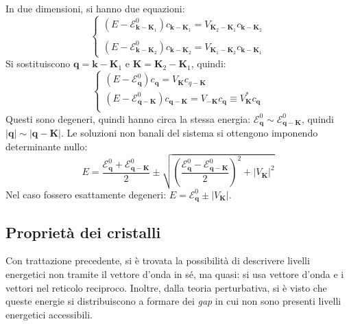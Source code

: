 \documentclass[10pt, a4paper]{scrartcl}
\numberwithin{equation}{subsection}
\theoremstyle{style1}
\begin{document}
In due dimensioni, si hanno due equazioni:
\[
\begin{cases}
	\displaystyle (E-\mathscr{E}^0_{\mathbf{k} - \mathbf{K} _1} )c_{\mathbf{k} -\mathbf{K} _1} = V_{\mathbf{K}_2 - \mathbf{K} _1} c_{\mathbf{k}-\mathbf{K}_2  } \\
	\\
	\displaystyle (E-\mathscr{E}^0_{\mathbf{k} - \mathbf{K} _2} )c_{\mathbf{k} -\mathbf{K} _2} = V_{\mathbf{K}_1 - \mathbf{K} _2} c_{\mathbf{k}-\mathbf{K}_1  } 
\end{cases}
\] 
Si sostituiscono $\mathbf{q} = \mathbf{k} -\mathbf{K} _1$ e $\mathbf{K} = \mathbf{K}_2 -\mathbf{K} _1$, quindi:
\begin{equation}
	\begin{cases}
		(E-\mathscr{E}^0_\mathbf{q} ) c_\mathbf{q}  = V_\mathbf{K} c_{q - \mathbf{K} } \\
		(E-\mathscr{E}^0_\mathbf{q-\mathbf{K} } ) c_\mathbf{q-\mathbf{K} }  = V_\mathbf{-K} c_{\mathbf{q} }\equiv V^*_\mathbf{K} c_\mathbf{q}  \\
	\end{cases}
\end{equation}
Questi sono degeneri, quindi hanno circa la stessa energia: $\mathscr{E}^0_{\mathbf{q} } \sim \mathscr{E}^0_{\mathbf{q} -\mathbf{K} } $, quindi $\lvert \mathbf{q}  \rvert \sim \lvert \mathbf{q} -\mathbf{K}  \rvert $. Le soluzioni non banali del sistema si ottengono imponendo determinante nullo:
\begin{equation}
	E = \frac{\mathscr{E}^0 _\mathbf{q}  + \mathscr{E}^0_{\mathbf{q- \mathbf{K} } } }{2} \pm \sqrt{\left(\frac{\mathscr{E}^0_\mathbf{q} - \mathscr{E}^0_{\mathbf{q} - \mathbf{K} } }{2}\right) ^2 + \lvert V_\mathbf{K}  \rvert ^2} 
\end{equation}
Nel caso fossero esattamente degeneri: $E  = \mathscr{E}^0_\mathbf{q} \pm \lvert V_\mathbf{K}  \rvert $.
\subsection{Propriet\`a dei cristalli}
Con trattazione precedente, si \`e trovata la possibilit\`a di descrivere livelli energetici non tramite il vettore d'onda in s\'e, ma quasi: si usa vettore d'onda e i vettori nel reticolo reciproco. Inoltre, dalla teoria perturbativa, si \`e visto che queste energie si distribuiscono a formare dei \textit{gap} in cui non sono presenti livelli energetici accessibili.
\end{document}
